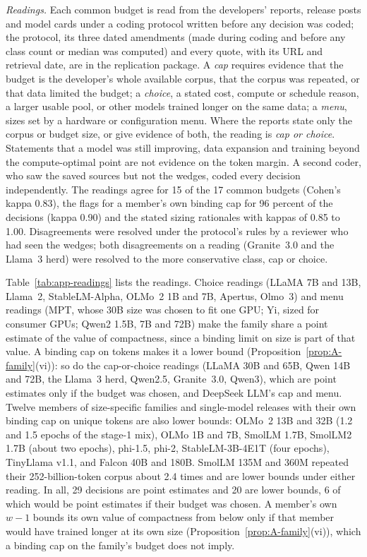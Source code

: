 \textit{Readings.} Each common budget is read from the developers' reports, release posts and model cards under a coding
protocol written before any decision was coded; the protocol, its three dated amendments (made during coding and before
any class count or median was computed) and every quote, with its URL and retrieval date, are in the replication package.
A \emph{cap} requires evidence that the budget is the developer's whole available corpus, that the corpus was repeated,
or that data limited the budget; a \emph{choice}, a stated cost, compute or schedule reason, a larger usable pool, or other
models trained longer on the same data; a \emph{menu}, sizes set by a hardware or configuration menu. Where the reports
state only the corpus or budget size, or give evidence of both, the reading is \emph{cap or choice}. Statements that a
model was still improving, data expansion and training beyond the compute-optimal point are not evidence on the token
margin. A second coder, who saw the saved sources but not the wedges, coded every decision independently. The readings
agree for 15 of the 17 common budgets (Cohen's kappa 0.83), the flags for a member's own binding cap for 96 percent of
the decisions (kappa 0.90) and the stated sizing rationales with kappas of 0.85 to 1.00. Disagreements were resolved
under the protocol's rules by a reviewer who had seen the wedges; both disagreements on a reading (Granite~3.0 and the
Llama~3 herd) were resolved to the more conservative class, cap or choice.

Table~\ref{tab:app-readings} lists the readings. Choice readings (LLaMA 7B and 13B, Llama~2, StableLM-Alpha, OLMo~2 1B
and 7B, Apertus, Olmo~3) and menu readings (MPT, whose 30B size was chosen to fit one GPU; Yi, sized for consumer GPUs;
Qwen2 1.5B, 7B and 72B) make the family share a point estimate of the value of compactness, since a binding limit on size
is part of that value. A binding cap on tokens makes it a lower bound (Proposition~\ref{prop:A-family}(vi)): so do the
cap-or-choice readings (LLaMA 30B and 65B, Qwen 14B and 72B, the Llama~3 herd, Qwen2.5, Granite~3.0, Qwen3), which are
point estimates only if the budget was chosen, and DeepSeek LLM's cap and menu. Twelve members of size-specific families
and single-model releases with their own binding cap on unique tokens are also lower bounds: OLMo~2 13B and 32B (1.2 and
1.5 epochs of the stage-1 mix), OLMo 1B and 7B, SmolLM 1.7B, SmolLM2 1.7B (about two epochs), phi-1.5, phi-2,
StableLM-3B-4E1T (four epochs), TinyLlama v1.1, and Falcon 40B and 180B. SmolLM 135M and 360M repeated their
252-billion-token corpus about 2.4 times and are lower bounds under either reading. In all, 29 decisions are point
estimates and 20 are lower bounds, 6 of which would be point estimates if their budget was chosen. A member's own $w-1$
bounds its own value of compactness from below only if that member would have trained longer at its own size
(Proposition~\ref{prop:A-family}(vi)), which a binding cap on the family's budget does not imply.


